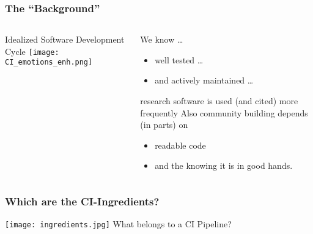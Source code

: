 \begin{frame}
	\frametitle{The “Background”}
	\begin{columns}
	    \begin{column}{0.5\textwidth}
			\centering 
			Idealized Software Development Cycle
			\texttt{[image: CI\_emotions\_enh.png]}
		\end{column}
		\begin{column}{0.5\textwidth}
			We know \ldots
			\begin{itemize}[<+->]
				\item well tested  \ldots
				\item and actively maintained \ldots
			\end{itemize}
		    research software is used (and cited) more frequently
		    \pause
		    Also community building depends (in parts) on
		    \begin{itemize}[<+->]
		    	\item readable code
		    	\item and the knowing it is in good hands.
		    \end{itemize}
		\end{column}

	\end{columns}
\end{frame}

\begin{frame}
	\frametitle{Which are the CI-Ingredients?}
	\begin{question}
		{
		\texttt{[image: ingredients.jpg]}
		What belongs to a CI Pipeline?
	}
	\end{question}
\end{frame}

